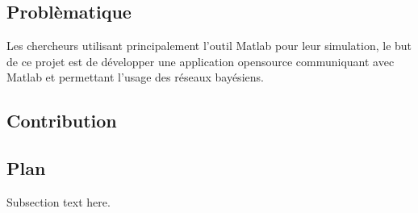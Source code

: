 \documentclass[conference]{IEEEtran}
\begin{document}
\subsection{Problèmatique}
Les chercheurs utilisant principalement l'outil Matlab pour leur simulation, le but de ce projet est de développer une application opensource communiquant avec Matlab et permettant l'usage des réseaux bayésiens.
\subsection{Contribution}


\subsection{Plan}
Subsection text here.




%
%

\end{document}

